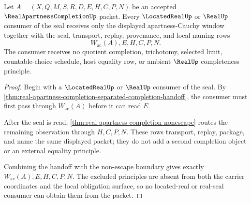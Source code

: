 \begin{theorem}
\label{thm:real-apartness-completion-located-real-seal-nonescape}
Let $A=(X,Q,M,S,R,D,E,H,C,P,N)$ be an accepted $\RealApartnessCompletionUp$ packet. Every $\LocatedRealUp$ or $\RealUp$ consumer of the seal receives only the displayed apartness-Cauchy window together with the seal, transport, replay, provenance, and local naming rows
$$
W_{\mathrm{ac}}(A),E,H,C,P,N .
$$
The consumer receives no quotient completion, trichotomy, selected limit, countable-choice schedule, host equality row, or ambient $\RealUp$ completeness principle.
\end{theorem}
\begin{proof}
Begin with a $\LocatedRealUp$ or $\RealUp$ consumer of the seal. By \autoref{thm:real-apartness-completion-separated-completion-handoff}, the consumer must first pass through $W_{\mathrm{ac}}(A)$ before it can read $E$.

After the seal is read, \autoref{thm:real-apartness-completion-nonescape} routes the remaining observation through $H,C,P,N$. These rows transport, replay, package, and name the same displayed packet; they do not add a second completion object or an external equality principle.

Combining the handoff with the non-escape boundary gives exactly $W_{\mathrm{ac}}(A),E,H,C,P,N$. The excluded principles are absent from both the carrier coordinates and the local obligation surface, so no located-real or real-seal consumer can obtain them from the packet.
\end{proof}

